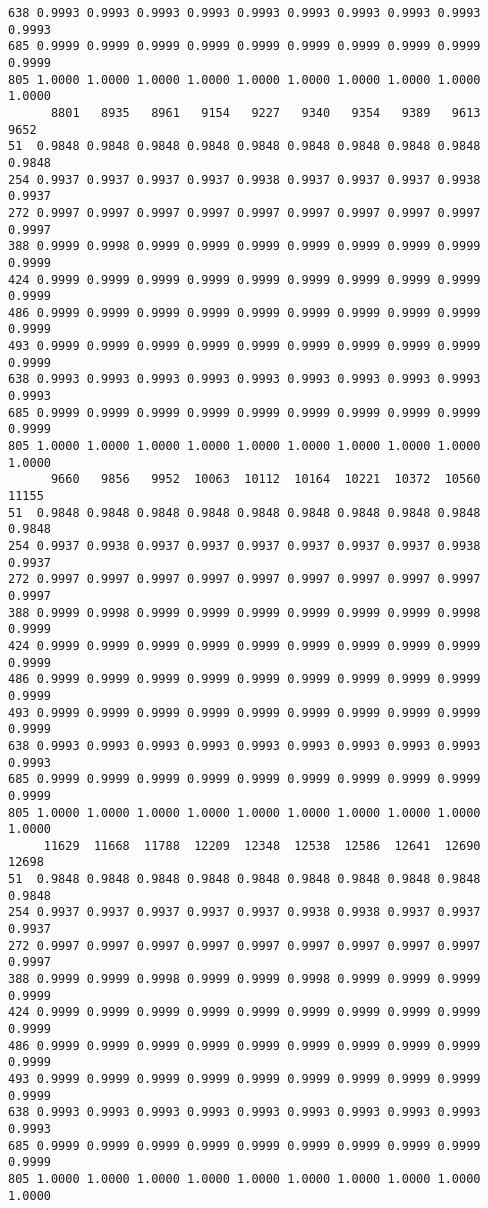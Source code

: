 \documentclass[
]{report}
\begin{document}
\begin{verbatim}
638 0.9993 0.9993 0.9993 0.9993 0.9993 0.9993 0.9993 0.9993 0.9993 0.9993
685 0.9999 0.9999 0.9999 0.9999 0.9999 0.9999 0.9999 0.9999 0.9999 0.9999
805 1.0000 1.0000 1.0000 1.0000 1.0000 1.0000 1.0000 1.0000 1.0000 1.0000
      8801   8935   8961   9154   9227   9340   9354   9389   9613   9652
51  0.9848 0.9848 0.9848 0.9848 0.9848 0.9848 0.9848 0.9848 0.9848 0.9848
254 0.9937 0.9937 0.9937 0.9937 0.9938 0.9937 0.9937 0.9937 0.9938 0.9937
272 0.9997 0.9997 0.9997 0.9997 0.9997 0.9997 0.9997 0.9997 0.9997 0.9997
388 0.9999 0.9998 0.9999 0.9999 0.9999 0.9999 0.9999 0.9999 0.9999 0.9999
424 0.9999 0.9999 0.9999 0.9999 0.9999 0.9999 0.9999 0.9999 0.9999 0.9999
486 0.9999 0.9999 0.9999 0.9999 0.9999 0.9999 0.9999 0.9999 0.9999 0.9999
493 0.9999 0.9999 0.9999 0.9999 0.9999 0.9999 0.9999 0.9999 0.9999 0.9999
638 0.9993 0.9993 0.9993 0.9993 0.9993 0.9993 0.9993 0.9993 0.9993 0.9993
685 0.9999 0.9999 0.9999 0.9999 0.9999 0.9999 0.9999 0.9999 0.9999 0.9999
805 1.0000 1.0000 1.0000 1.0000 1.0000 1.0000 1.0000 1.0000 1.0000 1.0000
      9660   9856   9952  10063  10112  10164  10221  10372  10560  11155
51  0.9848 0.9848 0.9848 0.9848 0.9848 0.9848 0.9848 0.9848 0.9848 0.9848
254 0.9937 0.9938 0.9937 0.9937 0.9937 0.9937 0.9937 0.9937 0.9938 0.9937
272 0.9997 0.9997 0.9997 0.9997 0.9997 0.9997 0.9997 0.9997 0.9997 0.9997
388 0.9999 0.9998 0.9999 0.9999 0.9999 0.9999 0.9999 0.9999 0.9998 0.9999
424 0.9999 0.9999 0.9999 0.9999 0.9999 0.9999 0.9999 0.9999 0.9999 0.9999
486 0.9999 0.9999 0.9999 0.9999 0.9999 0.9999 0.9999 0.9999 0.9999 0.9999
493 0.9999 0.9999 0.9999 0.9999 0.9999 0.9999 0.9999 0.9999 0.9999 0.9999
638 0.9993 0.9993 0.9993 0.9993 0.9993 0.9993 0.9993 0.9993 0.9993 0.9993
685 0.9999 0.9999 0.9999 0.9999 0.9999 0.9999 0.9999 0.9999 0.9999 0.9999
805 1.0000 1.0000 1.0000 1.0000 1.0000 1.0000 1.0000 1.0000 1.0000 1.0000
     11629  11668  11788  12209  12348  12538  12586  12641  12690  12698
51  0.9848 0.9848 0.9848 0.9848 0.9848 0.9848 0.9848 0.9848 0.9848 0.9848
254 0.9937 0.9937 0.9937 0.9937 0.9937 0.9938 0.9938 0.9937 0.9937 0.9937
272 0.9997 0.9997 0.9997 0.9997 0.9997 0.9997 0.9997 0.9997 0.9997 0.9997
388 0.9999 0.9999 0.9998 0.9999 0.9999 0.9998 0.9999 0.9999 0.9999 0.9999
424 0.9999 0.9999 0.9999 0.9999 0.9999 0.9999 0.9999 0.9999 0.9999 0.9999
486 0.9999 0.9999 0.9999 0.9999 0.9999 0.9999 0.9999 0.9999 0.9999 0.9999
493 0.9999 0.9999 0.9999 0.9999 0.9999 0.9999 0.9999 0.9999 0.9999 0.9999
638 0.9993 0.9993 0.9993 0.9993 0.9993 0.9993 0.9993 0.9993 0.9993 0.9993
685 0.9999 0.9999 0.9999 0.9999 0.9999 0.9999 0.9999 0.9999 0.9999 0.9999
805 1.0000 1.0000 1.0000 1.0000 1.0000 1.0000 1.0000 1.0000 1.0000 1.0000

\end{verbatim}
\end{document}

